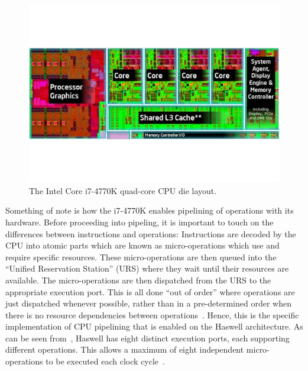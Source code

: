 \documentclass[a4paper,11pt]{article}
\begin{document}
\begin{figure}[h]
  \centering
  \includegraphics[scale=0.5]{img/haswell-layout}
  \caption{The Intel Core i7-4770K quad-core CPU die layout.~\cite{web:TomHWCorei7DiePic}}
\label{fig:haswell-layout}
\end{figure}

Something of note is how the i7-4770K enables pipelining of operations with its hardware. Before proceeding into pipeling, it is important to touch on the differences between instructions and operations: Instructions are decoded by the CPU into atomic parts which are known as micro-operations which use and require specific resources. These micro-operations are then queued into the ``Unified Reservation Station'' (URS) where they wait until their resources are available. The micro-operations are then dispatched from the URS to the appropriate execution port. This is all done ``out of order'' where operations are just dispatched whenever possible, rather than in a pre-determined order when there is no resource dependencies between operations~\cite{book:Corei7PerfAnalysis}. Hence, this is the specific implementation of CPU pipelining that is enabled on the Haswell architecture. As can be seen from~, Haswell has eight distinct execution ports, each supporting different operations. This allows a maximum of eight independent micro-operations to be executed each clock cycle~\cite{web:TomsHWCorei7}.
\end{document}
